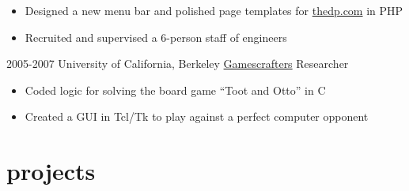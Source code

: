 \documentclass[]{friggeri-cv}
\begin{document}
\begin{entrylist}
{\begin{itemize}
      pageviews)
    \item Designed a new menu bar and polished page templates for
      \href{http://www.thedp.com}{thedp.com} in PHP
    \item Recruited and supervised a 6-person staff of engineers
    \end{itemize}
  }
  \entry
  {2005-2007}
  {University of California, Berkeley}
  {\href{http://gamescrafters.berkeley.edu/}{Gamescrafters} Researcher}
  {\begin{itemize}
    \item Coded logic for solving the board game ``Toot and Otto'' in C
    \item Created a GUI in Tcl/Tk to play against
      a perfect computer opponent
    \end{itemize}}
\end{entrylist}

\section{projects}
\end{document}
